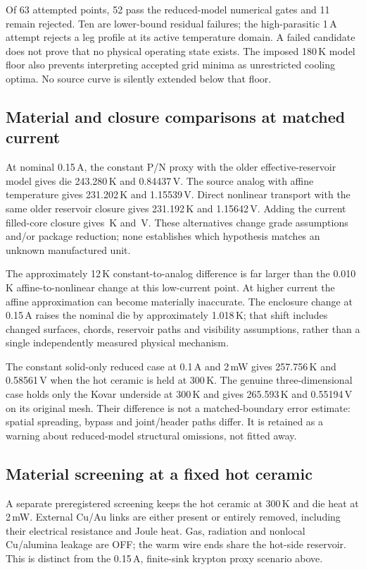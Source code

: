 \documentclass[11pt,a4paper]{article}
\begin{document}
Of 63 attempted points, 52 pass the reduced-model numerical gates and 11 remain rejected. Ten are lower-bound residual failures; the high-parasitic 1\,A attempt rejects a leg profile at its active temperature domain. A failed candidate does not prove that no physical operating state exists. The imposed 180\,K model floor also prevents interpreting accepted grid minima as unrestricted cooling optima. No source curve is silently extended below that floor.

\clearpage
\subsection{Material and closure comparisons at matched current}
At nominal 0.15\,A, the constant P/N proxy with the older effective-reservoir model gives die 243.280\,K and 0.84437\,V. The source analog with affine temperature gives 231.202\,K and 1.15539\,V. Direct nonlinear transport with the same older reservoir closure gives 231.192\,K and 1.15642\,V. Adding the current filled-core closure gives \ReducedDie\,K and \ReducedVoltage\,V. These alternatives change grade assumptions and/or package reduction; none establishes which hypothesis matches an unknown manufactured unit.

The approximately 12\,K constant-to-analog difference is far larger than the 0.010\,K affine-to-nonlinear change at this low-current point. At higher current the affine approximation can become materially inaccurate. The enclosure change at 0.15\,A raises the nominal die by approximately 1.018\,K; that shift includes changed surfaces, chords, reservoir paths and visibility assumptions, rather than a single independently measured physical mechanism.

The constant solid-only reduced case at 0.1\,A and 2\,mW gives 257.756\,K and 0.58561\,V when the hot ceramic is held at 300\,K. The genuine three-dimensional case holds only the Kovar underside at 300\,K and gives 265.593\,K and 0.55194\,V on its original mesh. Their difference is not a matched-boundary error estimate: spatial spreading, bypass and joint/header paths differ. It is retained as a warning about reduced-model structural omissions, not fitted away.

\clearpage
\subsection{Material screening at a fixed hot ceramic}
A separate preregistered screening keeps the hot ceramic at 300\,K and die heat
at 2\,mW. External Cu/Au links are either present or entirely removed, including
their electrical resistance and Joule heat. Gas, radiation and nonlocal
Cu/alumina leakage are OFF; the warm wire ends share the hot-side reservoir.
This is distinct from the 0.15\,A, finite-sink krypton proxy scenario above.
\end{document}
